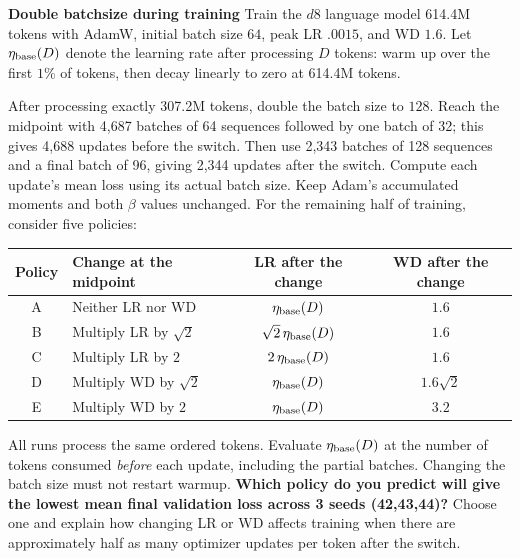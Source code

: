 \clearpage
\begin{examplequestion}[difficulty=hard]
\label{ex:a2-batch-switch}
\textbf{Double batchsize during training}
Train the $d8$ language model 614.4M tokens with AdamW,
initial batch size $64$, peak LR $.0015$, and WD $1.6$.
Let $\eta_{\rm base}(D)$ denote the learning rate after processing
$D$ tokens: warm up over the first $1\%$ of tokens, then decay linearly to zero
at 614.4M tokens.

After processing exactly 307.2M tokens, double the batch size to $128$.
Reach the midpoint with 4,687 batches of 64 sequences followed by one batch
of 32; this gives 4,688 updates before the switch. Then use 2,343 batches of
128 sequences and a final batch of 96, giving 2,344 updates after the switch.
Compute each update's mean loss using its actual batch size.
Keep Adam's accumulated moments and both $\beta$ values unchanged.
For the remaining half of training, consider five policies:
\begin{center}
\begin{tabular}{clcc}
\toprule
Policy & Change at the midpoint & LR after the change & WD after the change\\
\midrule
A & Neither LR nor WD & $\eta_{\rm base}(D)$ & $1.6$\\
B & Multiply LR by $\sqrt{2}$ & $\sqrt{2}\,\eta_{\rm base}(D)$ & $1.6$\\
C & Multiply LR by $2$ & $2\,\eta_{\rm base}(D)$ & $1.6$\\
D & Multiply WD by $\sqrt{2}$ & $\eta_{\rm base}(D)$ & $1.6\sqrt{2}$\\
E & Multiply WD by $2$ & $\eta_{\rm base}(D)$ & $3.2$\\
\bottomrule
\end{tabular}
\end{center}
All runs process the same ordered tokens. Evaluate $\eta_{\rm base}(D)$ at
the number of tokens consumed \emph{before} each update, including the partial
batches. Changing the batch size must not restart warmup.
\textbf{Which policy do you predict will give the lowest mean final validation loss across 3 seeds (42,43,44)?}
Choose one and explain how changing LR or WD affects training when there are approximately half as many optimizer updates per token after the switch.
\end{examplequestion}
